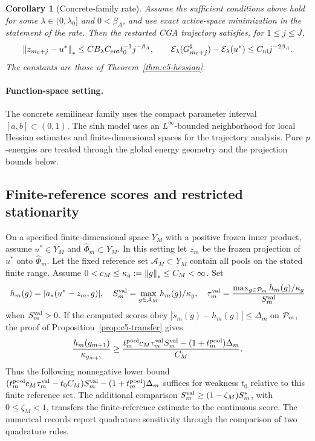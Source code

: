 \documentclass[11pt]{article}
\newtheorem{corollary}[theorem]{Corollary}
\theoremstyle{remark}
\begin{document}
\begin{corollary}[Concrete-family rate]
\label{cor:c5-concrete-family}
Assume the sufficient conditions above hold for some $\lambda\in(0,\lambda_0]$
and $0<\beta_A$, and use exact active-space minimization in the statement
of the rate.  Then the restarted CGA trajectory satisfies, for
$1\leq j\leq J$,
\begin{equation}
 \left\lVert z_{m_0+j}-u^*\right\rVert_*
   \leq C B_\lambda C_{\rm ent}t_0^{-1}j^{-\beta_A},
 \qquad
 \mathcal E_\lambda(G_{m_0+j}^\sharp)-\mathcal E_\lambda(u^*)
   \leq C_{\rm nl}j^{-2\beta_A}.
 \label{eq:c5-concrete-family-rate}
\end{equation}
The constants are those of Theorem~\ref{thm:c5-hessian}.
\end{corollary}

\paragraph{Function-space setting.}
The concrete semilinear family uses the compact parameter interval \([a,b]\subset(0,1)\). The sinh model uses an \(L^\infty\)-bounded neighborhood for local Hessian estimates and finite-dimensional spaces for the trajectory analysis. Pure \(p\)-energies are treated through the global energy geometry and the projection bounds below.

\subsection{Finite-reference scores and restricted stationarity}
\label{sec:c5-validation}

On a specified finite-dimensional space $Y_M$ with a positive frozen inner
product, assume $u^*\in Y_M$ and $\widehat\Phi_m\subset Y_M$.
In this setting let $z_m$ be the frozen projection of $u^*$ onto
$\widehat\Phi_m$. Let the fixed reference set $\mathcal A_M\subset Y_M$
contain all pools on the stated finite range.
Assume $0<c_M\leq\kappa_g:=\left\lVert g\right\rVert_*\leq C_M<\infty$.
Set
\[
 h_m(g)=|a_*(u^*-z_m,g)|,\quad
 S_m^{\rm val}=\max_{g\in\mathcal A_M}h_m(g)/\kappa_g,\quad
 \tau_m^{\rm val}
   =\frac{\max_{g\in\mathcal P_m}h_m(g)/\kappa_g}{S_m^{\rm val}}
\]
when $S_m^{\rm val}>0$.
If the computed scores obey
$|\widetilde s_m(g)-h_m(g)|\leq\Delta_m$ on $\mathcal P_m$, the proof of
Proposition~\ref{prop:c5-transfer} gives
\begin{equation}
 \frac{h_m(g_{m+1})}{\kappa_{g_{m+1}}}
 \geq
 \frac{t_m^{\rm pool}c_M\tau_m^{\rm val}S_m^{\rm val}
             -(1+t_m^{\rm pool})\Delta_m}{C_M}.
 \label{eq:c5-finite-margin}
\end{equation}
Thus the following nonnegative lower bound
$(t_m^{\rm pool}c_M\tau_m^{\rm val}-t_0C_M)S_m^{\rm val}
 -(1+t_m^{\rm pool})\Delta_m$ suffices for weakness $t_0$
relative to this finite reference set.
The additional comparison \(S_m^{\rm val}\ge(1-\zeta_M)S_m^*\), with \(0\le\zeta_M<1\), transfers the finite-reference estimate to the continuous score. The numerical records report quadrature sensitivity through the comparison of two quadrature rules.
\end{document}

